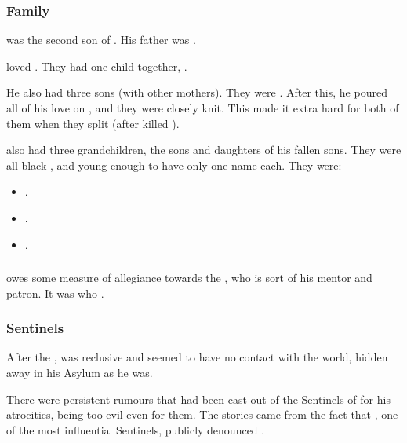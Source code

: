 \subsubsection{Family}
\Ishnaruchaefir was the second son of \TyarithXserasshana.
His father was . 

\Ishnaruchaefir{} loved \Triestessakhin. 
They had one child together, \Nzessuacrith. 

He also had three sons (with other mothers). 
They were . 
After this, he poured all of his love on \Nzessuacrith, and they were closely knit. 
This made it extra hard for both of them when they split (after \Ishnaruchaefir{} killed \Triestessakhin). 

\Ishnaruchaefir{} also had three grandchildren, the sons and daughters of his fallen sons. 
They were all black \dragons, and young enough to have only one name each. 
They were: 
\begin{itemize}
  \item {}. 
  \item {}. 
  \item {}. 
\end{itemize}





\subsubsection{\NerrhanKoss}
\Ishnaruchaefir{} owes some measure of allegiance towards the \xs{} , who is sort of his mentor and patron. 
It was \NerrhanKoss{} who . 





\subsubsection{Sentinels}
After the \SecondShrouding, \Ishnaruchaefir{} was reclusive and seemed to have no contact with the world, hidden away in his Asylum as he was. 

There were persistent rumours that \Ishnaruchaefir{} had been cast out of the Sentinels of \Miith{} for his atrocities, being too evil even for them. 
The stories came from the fact that \Secherdamon, one of the most influential Sentinels, publicly denounced \Ishnaruchaefir. 

